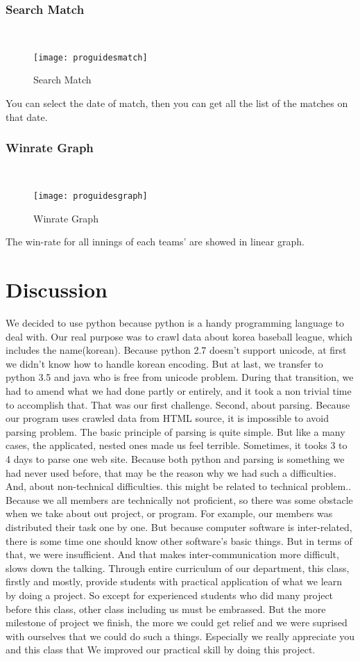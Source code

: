 \documentclass[conference,compsoc, twocolumn]{IEEEtran}
\begin{document}
\subsubsection{Search Match}\\
\begin{figure}[H]
\centering\texttt{[image: proguidesmatch]}
\caption{Search Match}
\end{figure}
You can select the date of match, then you can get all the list of the matches on that date.

\subsubsection{Winrate Graph}\\
\begin{figure}[H]
\centering\texttt{[image: proguidesgraph]}
\caption{Winrate Graph}
\end{figure}
The win-rate for all innings of each teams’ are showed in linear graph.


\section{Discussion}
We decided to use python because python is a handy programming language to deal with. Our   
real purpose was to crawl data about korea baseball league, which includes the name(korean). Because python 2.7 doesn't support unicode, at first we didn't know how to handle korean encoding.
But at last, we transfer to python 3.5 and java who is free from unicode problem. During that transition, we had to amend what we had done partly or entirely, and it took a non trivial time to accomplish that. That was our first challenge. Second, about parsing. Because our program uses crawled data from HTML source, it is impossible to avoid parsing problem. The basic principle of parsing is quite simple. But like a many cases, the applicated, nested ones made us feel terrible. Sometimes, it tooks 3 to 4 days to parse one web site. Because both python and parsing is something we had never used before, that may be the reason why we had such a difficulties.
And, about non-technical difficulties. this might be related to technical problem.. Because we all members are technically not proficient, so there was some obstacle when we take about out project, or program. For example, our members was distributed their task one by one. But because computer software is inter-related, there is some time one should know other software's basic things. But in terms of that, we were insufficient. And that makes inter-communication more difficult, slows down the talking. 
Through entire curriculum of our department, this class, firstly and mostly, provide students with practical application of what we learn by doing a project. So except for experienced students who did many project before this class, other class including us must be embrassed. But the more milestone of project we finish, the more we could get relief and we were suprised with ourselves that we could do such a things. Especially we really appreciate you and this class that We improved our practical skill by doing this project.
\end{document}
